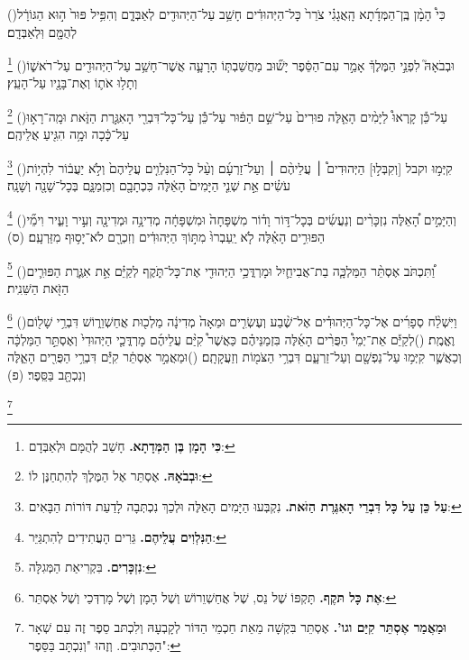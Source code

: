 \documentclass[12pt, openany]{book}
\newcommand{\footnotecomment}[1]{
	\renewcommand\thefootnote{}
	\footnote{\textsf{#1}}}
\newcommand{\commenta}[1]{\footnotecomment{#1}\hspace{0em}}
\newcommand{\vsnum}[1]{(\hebrewnumeral{#1})\space}
\begin{document}
\begin{multicols}{2}
\vsnum{24}כִּי֩ הָמָ֨ן בֶּֽן־הַמְּדָ֜תָא הָֽאֲגָגִ֗י צֹרֵר֙ כָּל־הַיְּהוּדִ֔ים חָשַׁ֥ב עַל־הַיְּהוּדִ֖ים לְאַבְּדָ֑ם וְהִפִּ֥יל פּוּר֙ ה֣וּא הַגּוֹרָ֔ל לְהֻמָּ֖ם וּֽלְאַבְּדָֽם׃%
\commenta{\textrm{\textbf{כִּי הָמָן בֶּן הַמְּדָתָא.}} חָשַׁב לְהֻמָּם וּלְאַבְּדָם:}%
\vsnum{25}וּבְבֹאָהּ֮ לִפְנֵ֣י הַמֶּלֶךְ֒ אָמַ֣ר עִם־הַסֵּ֔פֶר יָשׁ֞וּב מַחֲשַׁבְתּ֧וֹ הָרָעָ֛ה אֲשֶׁר־חָשַׁ֥ב עַל־הַיְּהוּדִ֖ים עַל־רֹאשׁ֑וֹ וְתָל֥וּ אֹת֛וֹ וְאֶת־בָּנָ֖יו עַל־הָעֵֽץ׃%
\commenta{\textrm{\textbf{וּבְבֹאָהּ.}} אֶסְתֵּר אֶל הַמֶּלֶךְ לְהִתְחַנֶּן לוֹ:}%
\vsnum{26}עַל־כֵּ֡ן קָֽרְאוּ֩ לַיָּמִ֨ים הָאֵ֤לֶּה פוּרִים֙ עַל־שֵׁ֣ם הַפּ֔וּר עַל־כֵּ֕ן עַל־כָּל־דִּבְרֵ֖י הָאִגֶּ֣רֶת הַזֹּ֑את וּמָֽה־רָא֣וּ עַל־כָּ֔כָה וּמָ֥ה הִגִּ֖יעַ אֲלֵיהֶֽם׃%
\commenta{\textrm{\textbf{עַל כֵּן עַל כָּל דִּבְרֵי הָאִגֶּרֶת הַזֹּאת.}} נִקְבְּעוּ הַיָּמִים הָאֵלֶּה וּלְכַךְ נִכְתְּבָה לָדַעַת דּוֹרוֹת הַבָּאִים:}%
\vsnum{27}קִיְּמ֣וּ וקבל [וְקִבְּל֣וּ] הַיְּהוּדִים֩ ׀ עֲלֵיהֶ֨ם ׀ וְעַל־זַרְעָ֜ם וְעַ֨ל כָּל־הַנִּלְוִ֤ים עֲלֵיהֶם֙ וְלֹ֣א יַעֲב֔וֹר לִהְי֣וֹת עֹשִׂ֗ים אֵ֣ת שְׁנֵ֤י הַיָּמִים֙ הָאֵ֔לֶּה כִּכְתָבָ֖ם וְכִזְמַנָּ֑ם בְּכָל־שָׁנָ֖ה וְשָׁנָֽה׃%
\commenta{\textrm{\textbf{הַנִּלְוִים עֲלֵיהֶם.}} גֵּרִים הָעֲתִידִים לְהִתְגַּיֵּר:}%
\vsnum{28}וְהַיָּמִ֣ים הָ֠אֵלֶּה נִזְכָּרִ֨ים וְנַעֲשִׂ֜ים בְּכָל־דּ֣וֹר וָד֗וֹר מִשְׁפָּחָה֙ וּמִשְׁפָּחָ֔ה מְדִינָ֥ה וּמְדִינָ֖ה וְעִ֣יר וָעִ֑יר וִימֵ֞י הַפּוּרִ֣ים הָאֵ֗לֶּה לֹ֤א יַֽעַבְרוּ֙ מִתּ֣וֹךְ הַיְּהוּדִ֔ים וְזִכְרָ֖ם לֹא־יָס֥וּף מִזַּרְעָֽם׃ (ס)%
\commenta{\textrm{\textbf{נִזְכָּרִים.}} בִּקְרִיאַת הַמְּגִלָּה:}%
\vsnum{29}וַ֠תִּכְתֹּב אֶסְתֵּ֨ר הַמַּלְכָּ֧ה בַת־אֲבִיחַ֛יִל וּמָרְדֳּכַ֥י הַיְּהוּדִ֖י אֶת־כָּל־תֹּ֑קֶף לְקַיֵּ֗ם אֵ֣ת אִגֶּ֧רֶת הַפּוּרִ֛ים הַזֹּ֖את הַשֵּׁנִֽית׃%
\commenta{\textrm{\textbf{אֶת כָּל תּקֶף.}} תָּקְפּוֹ שֶׁל נֵס, שֶׁל אֲחַשְׁוֵרוֹשׁ וְשֶׁל הָמָן וְשֶׁל מָרְדְּכַי וְשֶׁל אֶסְתֵּר: }%
\vsnum{30}וַיִּשְׁלַ֨ח סְפָרִ֜ים אֶל־כָּל־הַיְּהוּדִ֗ים אֶל־שֶׁ֨בַע וְעֶשְׂרִ֤ים וּמֵאָה֙ מְדִינָ֔ה מַלְכ֖וּת אֲחַשְׁוֵר֑וֹשׁ דִּבְרֵ֥י שָׁל֖וֹם וֶאֱמֶֽת׃
\vsnum{31}לְקַיֵּ֡ם אֵת־יְמֵי֩ הַפֻּרִ֨ים הָאֵ֜לֶּה בִּזְמַנֵּיהֶ֗ם כַּאֲשֶׁר֩ קִיַּ֨ם עֲלֵיהֶ֜ם מָרְדֳּכַ֤י הַיְּהוּדִי֙ וְאֶסְתֵּ֣ר הַמַּלְכָּ֔ה וְכַאֲשֶׁ֛ר קִיְּמ֥וּ עַל־נַפְשָׁ֖ם וְעַל־זַרְעָ֑ם דִּבְרֵ֥י הַצֹּמ֖וֹת וְזַעֲקָתָֽם׃
\vsnum{32}וּמַאֲמַ֣ר אֶסְתֵּ֔ר קִיַּ֕ם דִּבְרֵ֥י הַפֻּרִ֖ים הָאֵ֑לֶּה וְנִכְתָּ֖ב בַּסֵּֽפֶר׃ (פ)%
\commenta{\textrm{\textbf{וּמַאֲמַר אֶסְתֵּר קִיַּם וגו'.}} אֶסְתֵּר בִּקְשָׁה מֵאֵת חַכְמֵי הַדּוֹר לְקָבְעָהּ וְלִכְתּב סֵפֶר זֶה עִם שְׁאָר הַכְּתוּבִים. וְזֶהוּ "וְנִכְתָּב בַּסֵּפֶר": }%
\end{multicols}\newpage
\end{document}
